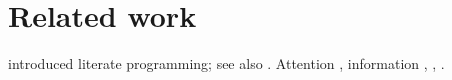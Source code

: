 \documentclass{article}
\begin{document}
\section{Related work}
\textcite{knuth1984} introduced literate programming; see also \parencite{lamport1994}. Attention \autocite{vaswani2017}, information \autocite[380]{shannon1948}, \cite{ctan}, \cite{doe2020}.
\printbibliography
\end{document}
